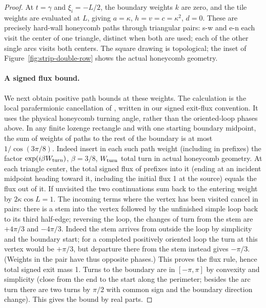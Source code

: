 \begin{proof}
At $t=\gamma$ and $\xi_i=-L/2$, the boundary weights $k$ are zero, and the tile weights are evaluated at $L$, giving $a=\kappa$, $h=v=c=\kappa^2$, $d=0$. These are precisely hard-wall honeycomb paths through triangular pairs: s-w and e-n each visit the center of one triangle, distinct when both are used; each of the other single arcs visits both centers. The square drawing is topological; the inset of Figure~\ref{fig:strip-double-row} shows the actual honeycomb geometry.

\paragraph{A signed flux bound.}\label{sec:strip-flux}
We next obtain positive path bounds at these weights. The calculation is the local parafermionic cancellation of \cite[Lemma~1]{DuminilCopinSmirnov2012}, written in our signed exit-flux convention. It uses the physical honeycomb turning angle, rather than the oriented-loop phases above. In any finite lozenge rectangle and with one starting boundary midpoint, the sum of weights of paths to the rest of the boundary is at most $1/\cos(3\pi/8)$. Indeed insert in each such path weight (including in prefixes) the factor $\exp(i\beta W_{\rm turn})$, $\beta=3/8$, $W_{\rm turn}$ total turn in actual honeycomb geometry. At each triangle center, the total signed flux of prefixes into it (ending at an incident midpoint heading toward it, including the initial flux 1 at the source) equals the flux out of it. If unvisited the two continuations sum back to the entering weight by $2\kappa\cos L=1$. The incoming terms where the vertex has been visited cancel in pairs: there is a stem into the vertex followed by the unfinished simple loop back to its third half-edge; reversing the loop, the changes of turn from the stem are $+4\pi/3$ and $-4\pi/3$. Indeed the stem arrives from outside the loop by simplicity and the boundary start; for a completed positively oriented loop the turn at this vertex would be $+\pi/3$, but departure there from the stem instead gives $-\pi/3$. (Weights in the pair have thus opposite phases.) This proves the flux rule, hence total signed exit mass 1. Turns to the boundary are in $[-\pi,\pi]$ by convexity and simplicity (close from the end to the start along the perimeter; besides the arc turn there are two turns by $\pi/2$ with common sign and the boundary direction change). This gives the bound by real parts.


\end{proof}
